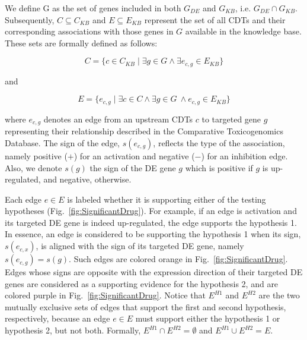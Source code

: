 We define G as  the set of genes included in both $G_{DE}$ and $G_{KB}$, i.e.  $G_{DE} \cap G_{KB}$. Subsequently, $C \subseteq C_{KB}$  and $E \subseteq E_{KB}$ represent the set of all CDTs and their corresponding associations with those genes in $G$ available in the knowledge base. These sets are formally defined as follows:

\begin{equation}C = \{c \in C_{KB} \mid \exists g \in G \land \exists e_{c,g} \in E_{KB} \}\end{equation}

and 

\begin{equation} E = \{ e_{c,g} \mid \exists c \in C \land  \exists g \in G \ \land  e_{c,g} \in E_{KB} \} \end{equation}


where $e_{c,g}$ denotes an edge from an upstream CDTs $c$ to targeted gene $g$ representing their relationship described in the Comparative Toxicogenomics Database. The sign of the edge, $s(e_{c,g})$, reflects the type of the association, namely positive ($+$) for an activation and negative ($-$) for an inhibition edge. Also, we denote $s(g)$ the sign of the DE gene $g$ which is positive if $g$ is up-regulated, and negative, otherwise. 

Each edge $e \in E$ is labeled whether it is supporting either of the testing hypotheses (Fig.~\ref{fig:SignificantDrug}). 
For example, if an edge is activation and its targeted DE gene is indeed up-regulated, the edge supports the hypothesis 1. 
In essence, an edge is considered to be supporting the hypothesis 1 when its sign, $s(e_{c,x})$, is aligned with the sign of its targeted DE gene, namely $s(e_{c,g}) = s(g)$. 
Such edges are colored orange in Fig.~\ref{fig:SignificantDrug}. 
Edges whose signs are opposite with the expression direction of their targeted DE genes are considered as a supporting evidence for the hypothesis 2, and are colored purple in  Fig.~\ref{fig:SignificantDrug}. 
Notice that $E^{H1}$ and $E^{H2}$ are the two mutually exclusive sets of edges that support the first and second hypothesis, respectively, because an edge $e \in E$ must support either the hypothesis 1 or hypothesis 2, but not both. Formally, $E^{H1} \cap E^{H2} = \emptyset$ and  $E^{H1} \cup E^{H2} = E$. 

